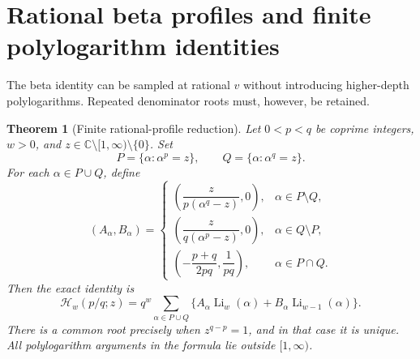 \documentclass[11pt]{article}
\numberwithin{equation}{section}
\newtheorem{theorem}{Theorem}[section]
\theoremstyle{definition}\newtheorem{definition}[theorem]{Definition}
\theoremstyle{remark}\newtheorem{remark}[theorem]{Remark}
\DeclareMathOperator{\Li}{Li}
\newcommand{\C}{\mathbb C}
\newcommand{\cut}{\C\setminus[1,\infty)}
\newcommand{\HH}{\mathcal H}
\begin{document}
\section{Rational beta profiles and finite polylogarithm identities}
\label{sec:cyclotomic}
The beta identity can be sampled at rational $v$ without introducing
higher-depth polylogarithms. Repeated denominator roots must, however,
be retained.

\begin{theorem}[Finite rational-profile reduction]\label{thm:profile}
Let $0<p<q$ be coprime integers, $w>0$, and $z\in\cut\setminus\{0\}$.
Set
\[
 P=\{\alpha:\alpha^p=z\},\qquad
 Q=\{\alpha:\alpha^q=z\}.
\]
For each $\alpha\in P\cup Q$, define
\begin{equation}\label{eq:profileAB}
 (A_\alpha,B_\alpha)=
 \begin{cases}
 \left(\dfrac{z}{p(\alpha^q-z)},0\right),&\alpha\in P\setminus Q,\\[6pt]
 \left(\dfrac{z}{q(\alpha^p-z)},0\right),&\alpha\in Q\setminus P,\\[6pt]
 \left(-\dfrac{p+q}{2pq},\dfrac1{pq}\right),&\alpha\in P\cap Q.
 \end{cases}
\end{equation}
Then the exact identity is
\begin{equation}\label{eq:profileLi}
 \HH_w(p/q;z)=q^w\sum_{\alpha\in P\cup Q}
 \{A_\alpha\Li_w(\alpha)+B_\alpha\Li_{w-1}(\alpha)\}.
\end{equation}
There is a common root precisely when $z^{q-p}=1$, and in that case
it is unique. All polylogarithm arguments in the formula lie outside
$[1,\infty)$.
\end{theorem}
\end{document}
